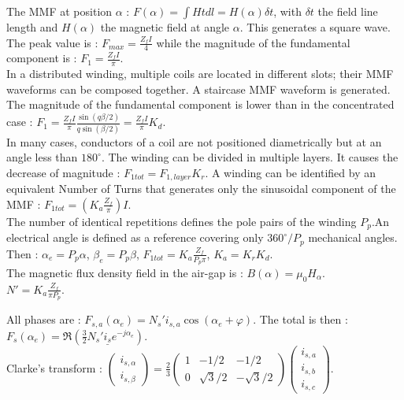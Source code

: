 \documentclass[../main.tex]{subfiles}
\begin{document}
The MMF at position $\alpha$ : $F(\alpha) = \int H t dl = H(\alpha) \delta t$, with $\delta t$ the field line length and $H(\alpha)$ the magnetic field at angle $\alpha$. This generates a square wave. The peak value is : $F_{max} = \frac{Z_f I}{4}$ while the magnitude of the fundamental component is : $F_1 = \frac{Z_f I}{\pi}$. \\
In a distributed winding, multiple coils are located in different slots; their MMF waveforms can be composed together. A staircase MMF waveform is generated. The magnitude of the fundamental component is lower than in the concentrated case : $F_1 = \frac{Z_fI}{\pi} \frac{\sin(q \beta/2)}{q\sin( \beta/2)} = \frac{Z_fI}{\pi} K_d$.\\
In many cases, conductors of a coil are not positioned diametrically but at an angle less than $180^\circ$. The winding can be divided in multiple layers. It causes the decrease of magnitude : $F_{1tot} = F_{1,layer} K_r$. A winding can be identified by an equivalent Number of Turns that generates only the sinusoidal component of the MMF : $F_{1tot} = (K_a \frac{Z_f}{\pi}) I$.\\
The number of identical repetitions defines the pole pairs of the winding $P_p$.An electrical angle is defined as a reference covering only $360^\circ/P_p$ mechanical angles. Then : $\alpha_e = P_p\alpha$, $\beta_e = P_p\beta$, $F_{1tot} = K_a \frac{Z_f}{P_p \pi}$, $K_a = K_rK_d$.\\
The magnetic flux density field in the air-gap is : $B(\alpha) = \mu_0 H_{\alpha}$.\\

$N' = K_a \frac{Z_f}{\pi P_p}$.

All phases are : $F_{s,a} (\alpha_e) = N_s' i_{s,a} \cos(\alpha_e+\varphi)$. The total is then : $F_s(\alpha_e) = \Re(\frac{3}{2} N_s' \underline{i_s} e^{-j\alpha_e})$.\\
Clarke's transform : $\begin{pmatrix}
    i_{s,\alpha}\\ i_{s,\beta}
\end{pmatrix} = \frac{2}{3} \begin{pmatrix}
    1 & -1/2 & -1/2\\ 0 & \sqrt{3}/2 & -\sqrt{3}/2
\end{pmatrix} \begin{pmatrix}
    i_{s,a}\\ i_{s,b}\\ i_{s,c}
\end{pmatrix}$.\\
\end{document}
